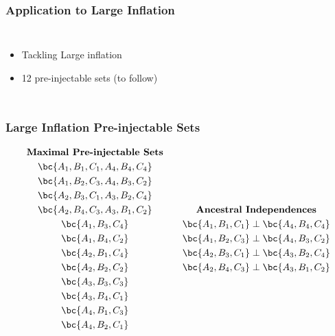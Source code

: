 \documentclass[
    hyperref={colorlinks=true, linkcolor=blue, urlcolor=blue, citecolor=MidnightBlue},
    xcolor={dvipsnames},
]{beamer}
\begin{document}
\begin{frame}
    \frametitle{Application to Large Inflation}
    \begin{columns}
            \begin{itemize}
                \item Tackling Large inflation
                \item 12 pre-injectable sets (to follow)
            \end{itemize}
            \scalebox{0.5}{}
    \end{columns}
\end{frame}

\begin{frame}
    \frametitle{Large Inflation Pre-injectable Sets}
    \begin{equation*}
        \begin{gathered}
            \textbf{Maximal Pre-injectable Sets} \\
            \bc{A_1, B_1, C_1, A_4, B_4, C_4} \\
            \bc{A_1, B_2, C_3, A_4, B_3, C_2} \\
            \bc{A_2, B_3, C_1, A_3, B_2, C_4} \\
            \bc{A_2, B_4, C_3, A_3, B_1, C_2} \\
            \bc{A_1, B_3, C_4} \\
            \bc{A_1, B_4, C_2} \\
            \bc{A_2, B_1, C_4} \\
            \bc{A_2, B_2, C_2} \\
            \bc{A_3, B_3, C_3} \\
            \bc{A_3, B_4, C_1} \\
            \bc{A_4, B_1, C_3} \\
            \bc{A_4, B_2, C_1}
        \end{gathered}
        \qquad
        \begin{gathered}
            \textbf{Ancestral Independences} \\
            \bc{A_1, B_1, C_1} \ancestralindep \bc{A_4, B_4, C_4} \\
            \bc{A_1, B_2, C_3} \ancestralindep \bc{A_4, B_3, C_2} \\
            \bc{A_2, B_3, C_1} \ancestralindep \bc{A_3, B_2, C_4} \\
            \bc{A_2, B_4, C_3} \ancestralindep \bc{A_3, B_1, C_2} \\

\end{gathered}
\end{equation*}
\end{frame}
\end{document}
